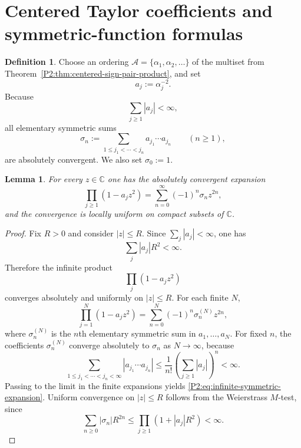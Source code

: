 \documentclass[11pt,a4paper]{article}
\numberwithin{equation}{section}
\newtheorem{lemma}[theorem]{Lemma}
\theoremstyle{definition}
\newtheorem{definition}[theorem]{Definition}
\theoremstyle{remark}
\newcommand{\CC}{\mathbb C}
\begin{document}
\section{Centered Taylor coefficients and symmetric-function formulas}

\begin{definition}
Choose an ordering $\mathcal A=\{\alpha_1,\alpha_2,\dots\}$ of the multiset from Theorem~\ref{P2:thm:centered-sign-pair-product}, and set
\[
a_j:=\alpha_j^{-2}.
\]
Because
\[
\sum_{j\ge 1}|a_j|<\infty,
\]
all elementary symmetric sums
\begin{equation}\label{P2:eq:elementary-symmetric-def}
\sigma_n:=\sum_{1\le j_1<\cdots<j_n} a_{j_1}\cdots a_{j_n}
\qquad (n\ge 1),
\end{equation}
are absolutely convergent.  We also set $\sigma_0:=1$.
\end{definition}

\begin{lemma}\label{P2:lem:infinite-symmetric-expansion}
For every $z\in\CC$ one has the absolutely convergent expansion
\begin{equation}\label{P2:eq:infinite-symmetric-expansion}
\prod_{j\ge 1}(1-a_j z^2)=\sum_{n=0}^{\infty}(-1)^n\sigma_n z^{2n},
\end{equation}
and the convergence is locally uniform on compact subsets of $\CC$.
\end{lemma}

\begin{proof}
Fix $R>0$ and consider $|z|\le R$.  Since $\sum_j |a_j|<\infty$, one has
\[
\sum_j |a_j|R^2<\infty.
\]
Therefore the infinite product
\[
\prod_j (1-a_j z^2)
\]
converges absolutely and uniformly on $|z|\le R$.  For each finite $N$,
\[
\prod_{j=1}^N(1-a_j z^2)=\sum_{n=0}^{N}(-1)^n\sigma_n^{(N)} z^{2n},
\]
where $\sigma_n^{(N)}$ is the $n$th elementary symmetric sum in $a_1,\dots,a_N$.  For fixed $n$, the coefficients $\sigma_n^{(N)}$ converge absolutely to $\sigma_n$ as $N\to\infty$, because
\[
\sum_{1\le j_1<\cdots<j_n<\infty}|a_{j_1}\cdots a_{j_n}|
\le \frac{1}{n!}\left(\sum_{j\ge 1}|a_j|\right)^n<\infty.
\]
Passing to the limit in the finite expansions yields \eqref{P2:eq:infinite-symmetric-expansion}.  Uniform convergence on $|z|\le R$ follows from the Weierstrass $M$-test, since
\[
\sum_{n\ge 0}|\sigma_n|R^{2n}\le \prod_{j\ge 1}(1+|a_j|R^2)<\infty.
\]
\end{proof}
\end{document}
